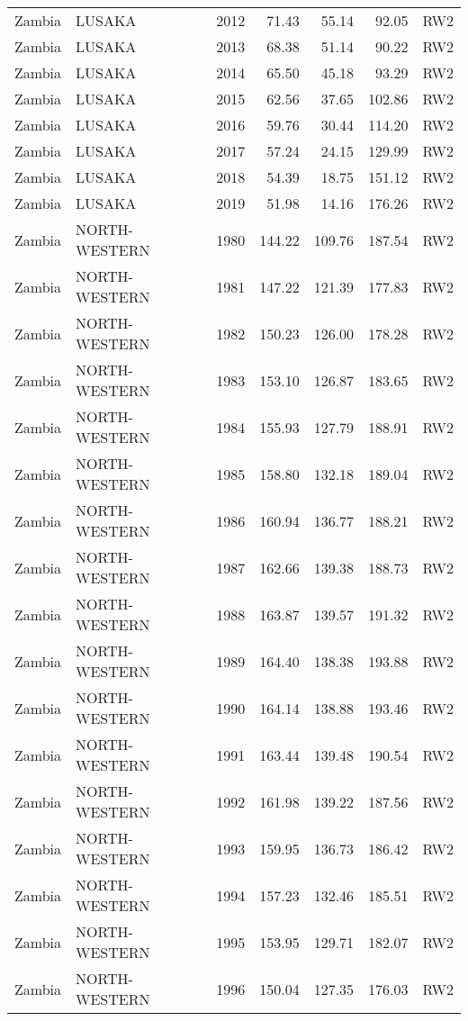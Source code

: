 \begin{longtable}{lllrrrl}
  Zambia & LUSAKA & 2012 & 71.43 & 55.14 & 92.05 & RW2 \\ 
  Zambia & LUSAKA & 2013 & 68.38 & 51.14 & 90.22 & RW2 \\ 
  Zambia & LUSAKA & 2014 & 65.50 & 45.18 & 93.29 & RW2 \\ 
  Zambia & LUSAKA & 2015 & 62.56 & 37.65 & 102.86 & RW2 \\ 
  Zambia & LUSAKA & 2016 & 59.76 & 30.44 & 114.20 & RW2 \\ 
  Zambia & LUSAKA & 2017 & 57.24 & 24.15 & 129.99 & RW2 \\ 
  Zambia & LUSAKA & 2018 & 54.39 & 18.75 & 151.12 & RW2 \\ 
  Zambia & LUSAKA & 2019 & 51.98 & 14.16 & 176.26 & RW2 \\ 
  Zambia & NORTH-WESTERN & 1980 & 144.22 & 109.76 & 187.54 & RW2 \\ 
  Zambia & NORTH-WESTERN & 1981 & 147.22 & 121.39 & 177.83 & RW2 \\ 
  Zambia & NORTH-WESTERN & 1982 & 150.23 & 126.00 & 178.28 & RW2 \\ 
  Zambia & NORTH-WESTERN & 1983 & 153.10 & 126.87 & 183.65 & RW2 \\ 
  Zambia & NORTH-WESTERN & 1984 & 155.93 & 127.79 & 188.91 & RW2 \\ 
  Zambia & NORTH-WESTERN & 1985 & 158.80 & 132.18 & 189.04 & RW2 \\ 
  Zambia & NORTH-WESTERN & 1986 & 160.94 & 136.77 & 188.21 & RW2 \\ 
  Zambia & NORTH-WESTERN & 1987 & 162.66 & 139.38 & 188.73 & RW2 \\ 
  Zambia & NORTH-WESTERN & 1988 & 163.87 & 139.57 & 191.32 & RW2 \\ 
  Zambia & NORTH-WESTERN & 1989 & 164.40 & 138.38 & 193.88 & RW2 \\ 
  Zambia & NORTH-WESTERN & 1990 & 164.14 & 138.88 & 193.46 & RW2 \\ 
  Zambia & NORTH-WESTERN & 1991 & 163.44 & 139.48 & 190.54 & RW2 \\ 
  Zambia & NORTH-WESTERN & 1992 & 161.98 & 139.22 & 187.56 & RW2 \\ 
  Zambia & NORTH-WESTERN & 1993 & 159.95 & 136.73 & 186.42 & RW2 \\ 
  Zambia & NORTH-WESTERN & 1994 & 157.23 & 132.46 & 185.51 & RW2 \\ 
  Zambia & NORTH-WESTERN & 1995 & 153.95 & 129.71 & 182.07 & RW2 \\ 
  Zambia & NORTH-WESTERN & 1996 & 150.04 & 127.35 & 176.03 & RW2 \\ 

\end{longtable}
